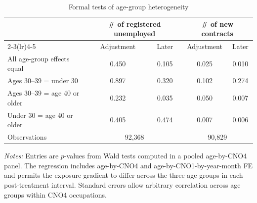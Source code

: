 \begin{table}[!htbp]
\centering
\caption{Formal tests of age-group heterogeneity}
\label{tab:v1_age_cross_group_tests}
\begin{threeparttable}
\small
\setlength{\tabcolsep}{5pt}
\begin{tabular}{lcccc}
\toprule
& \multicolumn{2}{c}{\# of registered unemployed} & \multicolumn{2}{c}{\# of new contracts} \\
\cmidrule(lr){2-3}\cmidrule(lr){4-5}
& Adjustment & Later & Adjustment & Later \\
\midrule
All age-group effects equal & 0.450 & 0.105 & 0.025 & 0.010 \\
Ages 30--39 = under 30 & 0.897 & 0.320 & 0.102 & 0.274 \\
Ages 30--39 = age 40 or older & 0.232 & 0.035 & 0.050 & 0.007 \\
Under 30 = age 40 or older & 0.405 & 0.474 & 0.007 & 0.006 \\
\midrule
Observations & \multicolumn{2}{c}{92,368} & \multicolumn{2}{c}{90,829} \\
\bottomrule
\end{tabular}
\begin{tablenotes}[flushleft]
\footnotesize
\item \emph{Notes:} Entries are $p$-values from Wald tests computed in a pooled age-by-CNO4 panel. The regression includes age-by-CNO4 and age-by-CNO1-by-year-month FE and permits the exposure gradient to differ across the three age groups in each post-treatment interval. Standard errors allow arbitrary correlation across age groups within CNO4 occupations.
\end{tablenotes}
\end{threeparttable}
\end{table}
